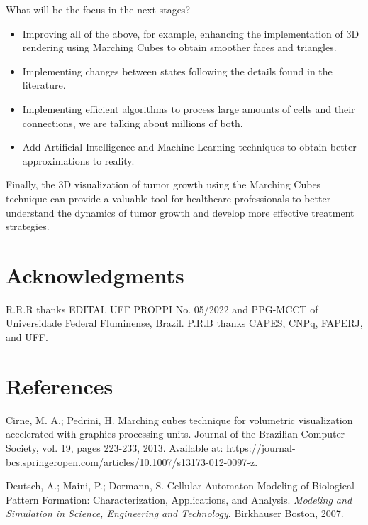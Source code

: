 \documentclass[a4paper,11pt]{article}
\begin{document}
{What will be the focus in the next stages? 
\begin{itemize}
    \item Improving all of the above, for example, enhancing the implementation of 3D rendering using Marching Cubes to obtain smoother faces and triangles.
    \item Implementing changes between states following the details found in the literature.
    \item Implementing efficient algorithms to process large amounts of cells and their connections, we are talking about millions of both.
    \item Add Artificial Intelligence and Machine Learning techniques to obtain better approximations to reality.
\end{itemize}

Finally, the 3D visualization of tumor growth using the Marching Cubes technique can provide a valuable tool for healthcare professionals to better understand the dynamics of tumor growth and develop more effective treatment strategies.

\section*{Acknowledgments}

R.R.R thanks EDITAL UFF PROPPI No. 05/2022 and PPG-MCCT of Universidade Federal Fluminense, Brazil.  P.R.B thanks CAPES, CNPq, FAPERJ, and UFF.


\section*{References}
\label{Nada}
\begin{flushleft}

\begin{thebibliography}{99}

 Cirne, M. A.; Pedrini, H. Marching cubes technique for volumetric visualization accelerated with graphics processing units. Journal of the Brazilian Computer Society, vol. 19, pages 223-233, 2013. Available at: https://journal-bcs.springeropen.com/articles/10.1007/s13173-012-0097-z.

\vskip 0.2cm
 Deutsch, A.; Maini, P.; Dormann, S. Cellular Automaton Modeling of Biological Pattern Formation: Characterization, Applications, and Analysis. \textit{Modeling and Simulation in Science, Engineering and Technology}. Birkhauser Boston, 2007.


\end{thebibliography}
\end{flushleft}}
\end{document}
